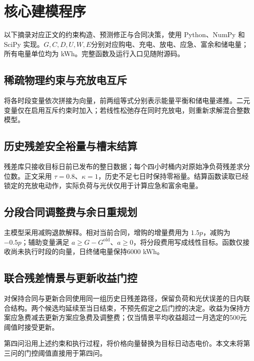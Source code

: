 \section{核心建模程序}
以下摘录对应正文的约束构造、预测修正与合同决策，使用 Python、NumPy 和 SciPy 实现。$G,C,D,U,W,E$分别对应购电、充电、放电、应急、富余和储电量；所有电量单位均为 kWh。完整函数及运行入口见随附源码。

\subsection{稀疏物理约束与充放电互斥}
将各时段变量依次拼接为向量，前两组等式分别表示能量平衡和储电量递推。二元变量仅在启用互斥约束时加入；若线性松弛存在同时充放电，则重新求解混合整数模型。



\clearpage
\subsection{历史残差安全裕量与槽末结算}
残差库只接收目标日前已发布的整日数据；每个四小时桶内对原始净负荷残差求分位数。正文采用 $\tau=0.8$、$\kappa=1$，历史不足七日时保持零裕量。结算函数读取已经锁定的充放电动作，实际负荷与光伏仅用于计算应急和富余电量。



\clearpage
\subsection{分段合同调整费与余日重规划}
主模型采用减购退款解释。相对当前合同，增购的增量费用为 $1.5p$，减购为 $-0.5p$；辅助变量满足 $a\ge G-G^{\mathrm{old}}$、$a\ge0$，将分段费用写成线性目标。函数仅接收尚未执行时段的向量，日终储电量保持6000 kWh。




\clearpage
\subsection{联合残差情景与更新收益门控}
对保持合同与更新合同使用同一组历史日残差路径，保留负荷和光伏误差的日内联合结构。两个候选均延续至当日结束，不预先假定之后门控的决定。收益为保持方案应急费减去更新方案应急费及调整费；仅当情景平均收益超过一月选定的500元阈值时接受更新。




第四问沿用上述约束和执行过程，将价格向量替换为目标日动态电价。本文未将第三问的门控阈值直接用于第四问。
